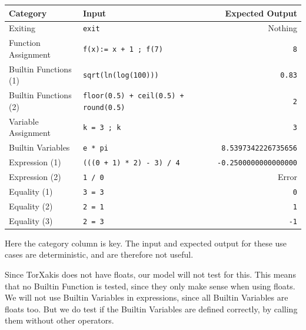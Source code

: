 \documentclass[11pt,a4paper]{article}
\begin{document}
\begin{center}
	\begin{tabular}{llr}
		Category & Input & Expected Output\\
		\hline
		Exiting & \texttt{exit} & Nothing\\
		Function Assignment & \texttt{f(x):= x + 1 ; f(7)} & \texttt{8}\\
		Builtin Functions (1) & \texttt{sqrt(ln(log(100)))} & \texttt{0.83}\\
		Builtin Functions (2) & \texttt{floor(0.5) + ceil(0.5) + round(0.5)} & \texttt{2}\\
		Variable Assignment & \texttt{k = 3 ; k} & \texttt{3}\\
		Builtin Variables & \texttt{e * pi} & \texttt{8.5397342226735656}\\
		Expression (1) & \texttt{(((0 + 1) * 2) - 3) / 4} & \texttt{-0.2500000000000000}\\
		Expression (2) & \texttt{1 / 0} & Error\\
		Equality (1) & \texttt{3 = 3} & \texttt{0}\\
		Equality (2) & \texttt{2 = 1} & \texttt{1}\\
		Equality (3) & \texttt{2 = 3} & \texttt{-1}\\
	\end{tabular}
\end{center}

Here the category column is key. The input and expected output for these use cases are deterministic, and are therefore not useful.

Since TorXakis does not have floats, our model will not test for this. This means that no Builtin Function is tested, since they only make sense when using floats. We will not use Builtin Variables in expressions, since all Builtin Variables are floats too. But we do test if the Builtin Variables are defined correctly, by calling them without other operators.



\end{document}
